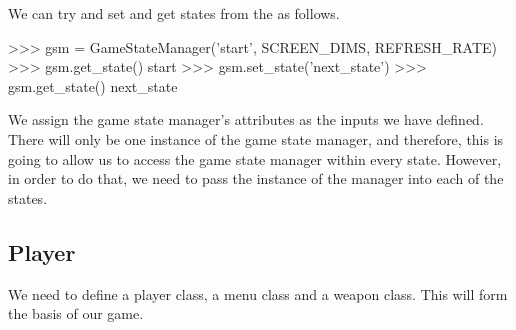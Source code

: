 \vs

We can try and set and get states from the  as follows.

\vs
\begin{mpy}
>>> gsm = GameStateManager('start', SCREEN_DIMS, REFRESH_RATE)
>>> gsm.get_state()
start
>>> gsm.set_state('next_state')
>>> gsm.get_state()
next_state
\end{mpy}
\vs
We assign the game state manager's attributes as the inputs we have defined. There will only be one instance of the game state manager, and therefore, this is going to allow us to access the game state manager within every state. However, in order to do that, we need to pass the instance of the manager into each of the states.


\vs

\subsection{Player}

We need to define a player class, a menu class and a weapon class. This will form the basis of our game.
\vs

